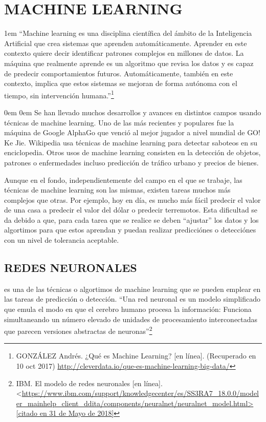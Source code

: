    \section{MACHINE LEARNING}
    
    \leftskip1em
    \rightskip\leftskip
    {\footnotesize \hspace{\parindent}
    “Machine learning es una disciplina científica del ámbito de la Inteligencia Artificial que crea sistemas que aprenden automáticamente. Aprender en este contexto quiere decir identificar patrones complejos en millones de datos. La máquina que realmente aprende es un algoritmo que revisa los datos y es capaz de predecir comportamientos futuros. Automáticamente, también en este contexto, implica que estos sistemas se mejoran de forma autónoma con el tiempo, sin intervención humana.”\footnote[10]{GONZÁLEZ  Andrés. ¿Qué es Machine Learning? [en línea]. (Recuperado en 10 oct 2017) \url{http://cleverdata.io/que-es-machine-learning-big-data/}}}

    \leftskip0em
    \rightskip0em
    Se han llevado muchos desarrollos y avances en distintos campos usando técnicas de machine learning. Uno de las más recientes y populares fue la máquina de Google AlphaGo que venció al mejor jugador a nivel mundial de GO! Ke Jie. 
    Wikipedia usa técnicas de machine learning para detectar saboteos en su enciclopedia. Otros usos de machine learning consisten en la detección de objetos, patrones o enfermedades incluso predicción de tráfico urbano y precios de bienes.
    
    Aunque en el fondo, independientemente del campo en el que se trabaje, las técnicas de machine learning son las mismas, existen tareas muchos más complejos que otras. Por ejemplo, hoy en día, es mucho más fácil predecir el valor de una casa a predecir el valor del dólar o predecir terremotos. Esta dificultad se da debido a que, para cada tarea que se realice se deben “ajustar” los datos y los algortimos para que estos aprendan y puedan realizar predicciónes o detecciónes con un nivel de tolerancia aceptable.
    
    \subsection{REDES NEURONALES} es una de las técnicas o algortimos de machine learning que se pueden emplear en las tareas de predicción o detección. “Una red neuronal es un modelo simplificado que emula el modo en que el cerebro humano procesa la información: Funciona simultaneando un número elevado de unidades de procesamiento interconectadas que parecen versiones abstractas de neuronas”\footnote[11]{IBM. El modelo de redes neuronales [en línea]. <\url{https://www.ibm.com/support/knowledgecenter/es/SS3RA7_18.0.0/modeler_mainhelp_client_ddita/components/neuralnet/neuralnet_model.html> [citado en 31 de Mayo de 2018]} }
    
